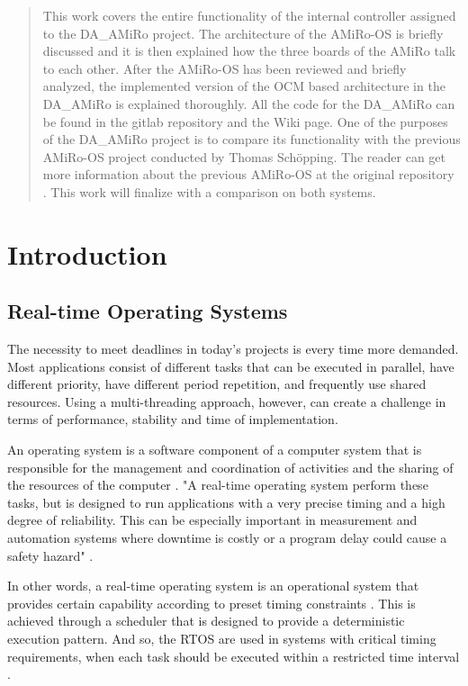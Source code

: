 \documentclass[12pt]{report}%
\begin{document}
\begin{abstract}
This work covers the entire functionality of the internal controller assigned to the DA\_AMiRo project. The architecture of the AMiRo-OS is briefly discussed and it is then explained how the three boards of the AMiRo talk to each other. After the AMiRo-OS has been reviewed and briefly analyzed, the implemented version of the OCM based architecture in the DA\_AMiRo is explained thoroughly. All the code for the DA\_AMiRo can be found in the gitlab repository and the Wiki page. One of the purposes of the DA\_AMiRo project is to compare its functionality with the previous AMiRo-OS project conducted by Thomas Schöpping. The reader can get more information about the previous AMiRo-OS at the original repository \cite{AMiRo_Wiki}. This work will finalize with a comparison on both systems.
\end{abstract}

\chapter{Introduction}
\section{Real-time Operating Systems}
The necessity to meet deadlines in today's projects is every time more demanded. Most applications consist of different tasks that can be executed in parallel, have different priority, have different period repetition, and frequently use shared resources. Using a multi-threading approach, however,  can create a challenge in terms of performance, stability and time of implementation.

An operating system is a software component of a computer system that is responsible for the management and coordination of activities and the sharing of the resources of the computer \cite{mcgraw}. "A real-time operating system perform these tasks, but is designed to run applications with a very precise timing and a high degree of reliability. This can be especially important in measurement and automation systems where downtime is costly or a program delay could cause a safety hazard" \cite{rtos}.

In other words, a real-time operating system is an operational system that provides certain capability according to preset timing constraints \cite{whatisRTOS}. This is achieved through a scheduler that is designed to provide a deterministic execution pattern. And so, the RTOS are used in systems with critical timing requirements, when each task should be executed within a restricted time interval \cite{whatisRTOS}.
\end{document}

